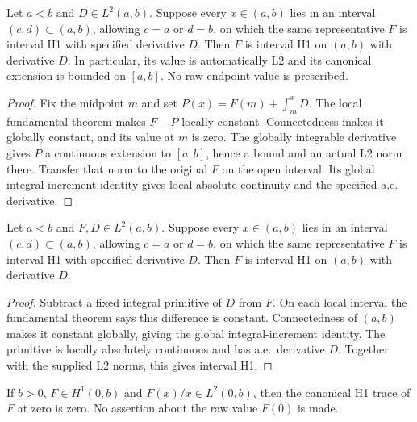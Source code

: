 \begin{lemma}
\label{lem:h1-local-finite-derivative}
\leanok
Let $a<b$ and $D\in L^2(a,b)$.
Suppose every $x\in(a,b)$ lies in an interval $(c,d)\subset(a,b)$,
allowing $c=a$ or $d=b$, on which the same representative $F$ is
interval H1 with specified derivative $D$.
Then $F$ is interval H1 on $(a,b)$ with derivative $D$.
In particular, its value is automatically L2 and its canonical extension
is bounded on $[a,b]$. No raw endpoint value is prescribed.
\end{lemma}

\begin{proof}
\leanok
Fix the midpoint $m$ and set $P(x)=F(m)+\int_m^xD$.
The local fundamental theorem makes $F-P$ locally constant.
Connectedness makes it globally constant, and its value at $m$ is zero.
The globally integrable derivative gives $P$ a continuous extension to
$[a,b]$, hence a bound and an actual L2 norm there.
Transfer that norm to the original $F$ on the open interval.
Its global integral-increment identity gives local absolute continuity
and the specified a.e. derivative.
\end{proof}

\begin{lemma}
\label{lem:h1-local-global}
\leanok
Let $a<b$ and $F,D\in L^2(a,b)$. Suppose every $x\in(a,b)$ lies
in an interval $(c,d)\subset(a,b)$, allowing $c=a$ or $d=b$, on which
the same representative $F$ is interval H1 with specified derivative $D$.
Then $F$ is interval H1 on $(a,b)$ with derivative $D$.
\end{lemma}

\begin{proof}
\leanok
Subtract a fixed integral primitive of $D$ from $F$.
On each local interval the fundamental theorem says this difference is
constant. Connectedness of $(a,b)$ makes it constant globally, giving
the global integral-increment identity.
The primitive is locally absolutely continuous and has a.e.\ derivative $D$.
Together with the supplied L2 norms, this gives interval H1.
\end{proof}

\begin{lemma}
\label{lem:h1-div-zero-trace}
\leanok
If $b>0$, $F\in H^1(0,b)$ and $F(x)/x\in L^2(0,b)$, then the
canonical H1 trace of $F$ at zero is zero.
No assertion about the raw value $F(0)$ is made.
\end{lemma}

